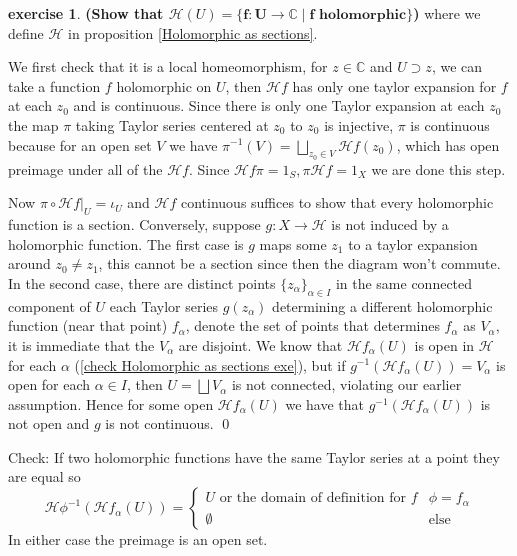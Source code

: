 \documentclass[10.5pt]{article}
\theoremstyle{definition}
\newtheorem{exe}{exercise}
\newcommand{\set}[1]{\{#1\}}
\newcommand{\tor}{\text{ or }}
\begin{document}
    \begin{exe}\label{Holomorphic as sections exe}
        \textbf{(Show that \(\mathcal{H}(U) = \mathbf{\set{f: U \to \mathbb{C} \mid f \text{ holomorphic}}}\))} where we define \(\mathcal{H}\) in proposition \ref{Holomorphic as sections}.

        We first check that it is a local homeomorphism, for \(z \in \mathbb{C}\) and \(U \supset z\), we can take a function \(f\) holomorphic on \(U\), then \(\mathcal{H}f\) has only one taylor expansion for \(f\) at each \(z_0\) and is continuous. Since there is only one Taylor expansion at each \(z_0\) the map \(\pi\) taking Taylor series centered at \(z_0\) to \(z_0\) is injective, \(\pi\) is continuous because for an open set \(V\) we have \(\pi^{-1}(V) = \bigsqcup_{z_0 \in V}\mathcal{H}f(z_0)\), which has open preimage under all of the \(\mathcal{H}f\). Since \(\mathcal{H}f\pi = 1_S, \pi \mathcal{H}f = 1_X\) we are done this step.

        Now \(\pi \circ \mathcal{H}f\vert_U = \iota_U\) and \(\mathcal{H}f\) continuous suffices to show that every holomorphic function is a section. Conversely, suppose \(g: X \to \mathcal{H}\) is not induced by a holomorphic function. The first case is \(g\) maps some \(z_1\) to a taylor expansion around \(z_0 \neq z_1\), this cannot be a section since then the diagram won't commute. In the second case, there are distinct points \(\set{z_\alpha}_{\alpha\in I}\) in the same connected component of \(U\) each Taylor series \(g(z_\alpha)\) determining a different holomorphic function (near that point) \(f_\alpha\), denote the set of points that determines \(f_\alpha\) as \(V_\alpha\), it is immediate that the \(V_\alpha\) are disjoint. We know that \(\mathcal{H} f_\alpha(U)\) is open in \(\mathcal{H}\) for each \(\alpha\) (\ref{check Holomorphic as sections exe}), but if \(g^{-1}(\mathcal{H} f_\alpha(U)) = V_\alpha\) is open for each \(\alpha \in I\), then \(U = \bigsqcup V_\alpha\) is not connected, violating our earlier assumption. Hence for some open \(\mathcal{H} f_\alpha(U)\) we have that \(g^{-1}(\mathcal{H} f_\alpha(U))\) is not open and \(g\) is not continuous. \qed

        \makeatletter{}\makeatother \label{check Holomorphic as sections exe}Check: If two holomorphic functions have the same Taylor series at a point they are equal so \[\mathcal{H}\phi^{-1} (\mathcal{H}f_\alpha(U)) = \begin{cases}
        U \tor \text{the domain of definition for }f &\phi = f_\alpha \\
        \emptyset &\text{else}
        \end{cases}\]
        In either case the preimage is an open set.
    \end{exe}
\end{document}
